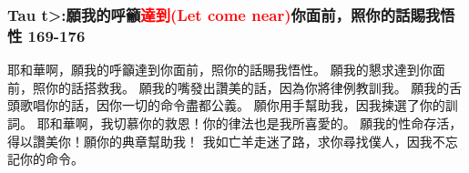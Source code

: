\subsubsection{Tau  \<t>:願我的呼籲\textcolor{red}{達到(Let come near)}你面前，照你的話賜我悟性 169-176}
耶和華啊，願我的呼籲達到你面前，照你的話賜我悟性。
願我的懇求達到你面前，照你的話搭救我。
願我的嘴發出讚美的話，因為你將律例教訓我。
願我的舌頭歌唱你的話，因你一切的命令盡都公義。
願你用手幫助我，因我揀選了你的訓詞。
耶和華啊，我切慕你的救恩！你的律法也是我所喜愛的。
願我的性命存活，得以讚美你！願你的典章幫助我！
我如亡羊走迷了路，求你尋找僕人，因我不忘記你的命令。






























